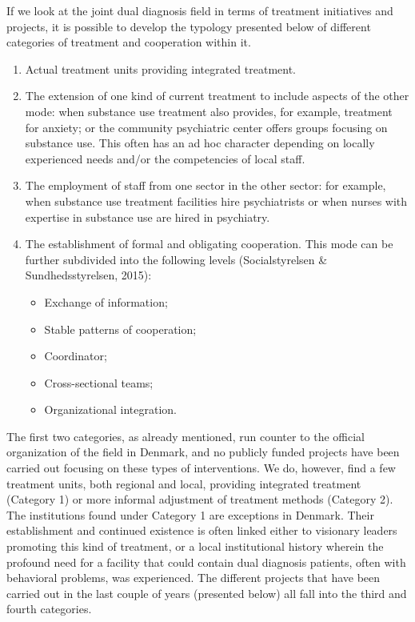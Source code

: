 \begin{multicols}{2}
\par
If we look at the joint dual diagnosis field in terms of treatment initiatives and projects, it is possible to develop the typology presented below of different categories of treatment and cooperation within it.
    \begin{enumerate}
        \item Actual treatment units providing integrated treatment.
        \item The extension of one kind of current treatment to include aspects of the other mode: when substance use treatment also provides, for example, treatment for anxiety; or the community psychiatric center offers groups focusing on substance use. This often has an ad hoc character depending on locally experienced needs and/or the competencies of local staff.
        \item The employment of staff from one sector in the other sector: for example, when substance use treatment facilities hire psychiatrists or when nurses with expertise in substance use are hired in psychiatry.
        \item The establishment of formal and obligating cooperation. This mode can be further subdivided into the following levels (Socialstyrelsen \& Sundhedsstyrelsen, 2015):
            \begin{itemize}
                \item Exchange of information;
                \item Stable patterns of cooperation;
                \item Coordinator;
                \item Cross-sectional teams; 
                \item Organizational integration.
            \end{itemize}
    \end{enumerate}
The first two categories, as already mentioned, run counter to the official organization of the field in Denmark, and no publicly funded projects have been carried out focusing on these types of interventions. We do, however, find a few treatment units, both regional and local, providing integrated treatment (Category 1) or more informal adjustment of treatment methods (Category 2). The institutions found under Category 1 are exceptions in Denmark. Their establishment and continued existence is often linked either to visionary leaders promoting this kind of treatment, or a local institutional history wherein the profound need for a facility that could contain dual diagnosis patients, often with behavioral problems, was experienced. The different projects that have been carried out in the last couple of years (presented below) all fall into the third and fourth categories.
 

\end{multicols}
